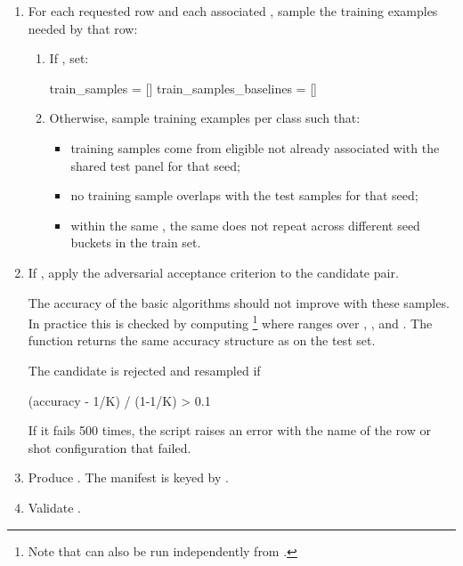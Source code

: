 \documentclass[11pt]{article}
\begin{document}
\begin{enumerate}
  \item For each requested row and each associated , sample the training examples needed by that row:
  \begin{enumerate}
    \item If , set:
    \begin{DocCode}
train_samples = []
train_samples_baselines = []
    \end{DocCode}

    \item Otherwise, sample  training examples per class such that:
    \begin{itemize}
      \item training samples come from eligible  not already associated with the shared test panel for that seed;
      \item no training sample overlaps with the test samples for that seed;
      \item within the same , the same  does not repeat across different seed buckets in the train set.
    \end{itemize}
  \end{enumerate}

  \item If , apply the adversarial acceptance criterion to the candidate 
   pair.

The accuracy of the basic algorithms should not improve with these samples. In practice this is checked by computing
%
\footnote{Note that  can also be run independently from 
.}
where  ranges over , , and 
. The function returns the same accuracy structure as  on the test set.

  The candidate is rejected and resampled if
  \begin{DocCode}
(accuracy - 1/K) / (1-1/K) > 0.1
  \end{DocCode}

  If it fails 500 times, the script raises an error with the name of the row or shot configuration that failed.
  \item Produce . The manifest is keyed by .
  \item Validate .

\end{enumerate}
\end{document}

